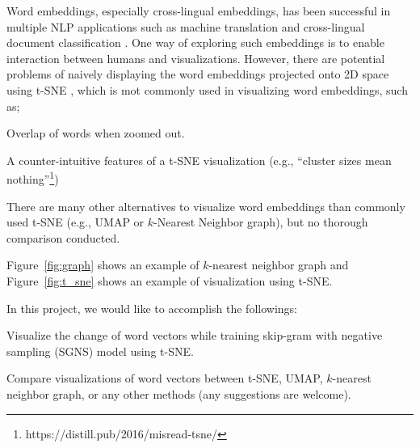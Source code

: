 Word embeddings, especially cross-lingual embeddings, has been successful in multiple NLP applications such as machine translation \cite{lample2018unsupervised, artetxe2018unsupervised} and cross-lingual document classification \cite{klementiev-titov-bhattarai:2012:PAPERS}. 
One way of exploring such embeddings is to enable interaction between humans and visualizations. 
However, there are potential problems of naively displaying the word embeddings projected onto 2D space using t-SNE \cite{t-sne}, which is mot commonly used in visualizing word embeddings, such as;
\begin{itemize*}
  \item Overlap of words when zoomed out. 
  \item A counter-intuitive features of a t-SNE visualization (e.g., ``cluster sizes mean nothing''\footnote{https://distill.pub/2016/misread-tsne/}) 
  \item There are many other alternatives to visualize word embeddings than commonly used t-SNE (e.g., UMAP \cite{umap} or $k$-Nearest Neighbor graph), but no thorough comparison conducted. 
\end{itemize*}
Figure~\ref{fig:graph} shows an example of $k$-nearest neighbor graph and Figure~\ref{fig:t_sne} shows an example of visualization using t-SNE. 

In this project, we would like to accomplish the followings:
\begin{itemize*}
 \item Visualize the change of word vectors while training skip-gram with negative sampling (SGNS) model \cite{NIPS2013_5021} using t-SNE.
 \item Compare visualizations of word vectors between t-SNE, UMAP, $k$-nearest neighbor graph, or any other methods (any suggestions are welcome).
\end{itemize*}
